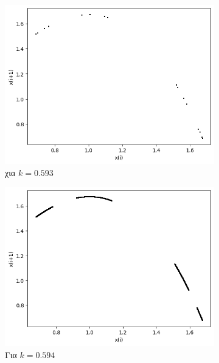 \begin{figure}[ht]
	\centering
	\begin{subfigure}[b]{0.4\textwidth}
		\centering
		\includegraphics[width=\textwidth]{LateX images/graphs q07/g8}
		\caption{χια $k=0.593$}
		\label{f:k42}
	\end{subfigure}
	\hfill
	\begin{subfigure}[b]{0.4\textwidth}
		\centering
		\includegraphics[width=\textwidth]{LateX images/graphs q07/g9}
		\caption{Για $k=0.594$}
		\label{f:k43}
	\end{subfigure}
	\hfill
	\begin{subfigure}[b]{0.4\textwidth}
		\centering

\end{subfigure}
\end{figure}
